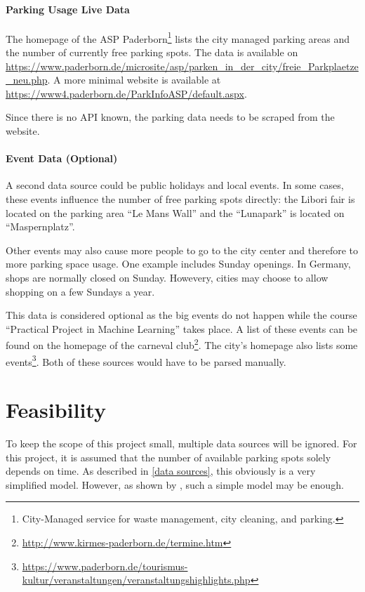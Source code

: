 \documentclass[journal,10pt]{IEEEtran}
\begin{document}
\paragraph{Parking Usage Live Data}
The homepage of the ASP Paderborn\footnote{City-Managed service for waste management, city cleaning, and parking.} lists the city managed parking areas and the number of currently free parking spots. 
The data is available on \url{https://www.paderborn.de/microsite/asp/parken_in_der_city/freie_Parkplaetze_neu.php}. A more minimal website is available at \url{https://www4.paderborn.de/ParkInfoASP/default.aspx}. 

Since there is no API known, the parking data needs to be scraped from the website.  
\paragraph{Event Data (Optional)}
A second data source could be public holidays and local events. In some cases, these events influence the number of free parking spots directly: the Libori fair is located on the parking area ``Le Mans Wall'' and the ``Lunapark'' is located on ``Maspernplatz''. 

Other events may also cause more people to go to the city center and therefore to more parking space usage. One example includes Sunday openings. In Germany, shops are normally closed on Sunday. Howevery, cities may choose to allow shopping on a few Sundays a year. 

This data is considered optional as the big events do not happen while the course ``Practical Project in Machine Learning'' takes place. A list of these events can be found on the homepage of the carneval club\footnote{\url{http://www.kirmes-paderborn.de/termine.htm}}. The city's homepage also lists some events\footnote{\url{https://www.paderborn.de/tourismus-kultur/veranstaltungen/veranstaltungshighlights.php}}. Both of these sources would have to be parsed manually.



\section{Feasibility}

To keep the scope of this project small, multiple data sources will be ignored. For this project, it is assumed that the number of available parking spots solely depends on time. As described in \ref{data sources}, this obviously is a very simplified model. However, as shown by \cite{parkendd}, such a simple model may be enough. 
\end{document}
